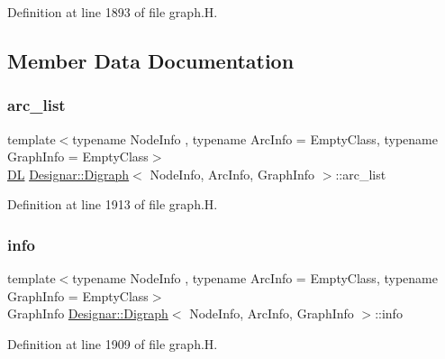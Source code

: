 Definition at line 1893 of file graph.\+H.



\subsection{Member Data Documentation}
\mbox{\label{class_designar_1_1_digraph_ad860dbe9732bc90906a486cad390637a}} 
\subsubsection{\texorpdfstring{arc\+\_\+list}{arc\_list}}
{\footnotesize\ttfamily template$<$typename Node\+Info , typename Arc\+Info  = Empty\+Class, typename Graph\+Info  = Empty\+Class$>$ \\
\hyperlink{class_designar_1_1_d_l}{DL} \hyperlink{class_designar_1_1_digraph}{Designar\+::\+Digraph}$<$ Node\+Info, Arc\+Info, Graph\+Info $>$\+::arc\+\_\+list\hspace{0.3cm}{\ttfamily [protected]}}



Definition at line 1913 of file graph.\+H.

\mbox{\label{class_designar_1_1_digraph_aec655bb1b26775cb7ad3581240290efe}} 
\subsubsection{\texorpdfstring{info}{info}}
{\footnotesize\ttfamily template$<$typename Node\+Info , typename Arc\+Info  = Empty\+Class, typename Graph\+Info  = Empty\+Class$>$ \\
Graph\+Info \hyperlink{class_designar_1_1_digraph}{Designar\+::\+Digraph}$<$ Node\+Info, Arc\+Info, Graph\+Info $>$\+::info\hspace{0.3cm}{\ttfamily [protected]}}



Definition at line 1909 of file graph.\+H.

\mbox{\label{class_designar_1_1_digraph_ac81c264dab34ca74fc62b0693c1c3543}} 
